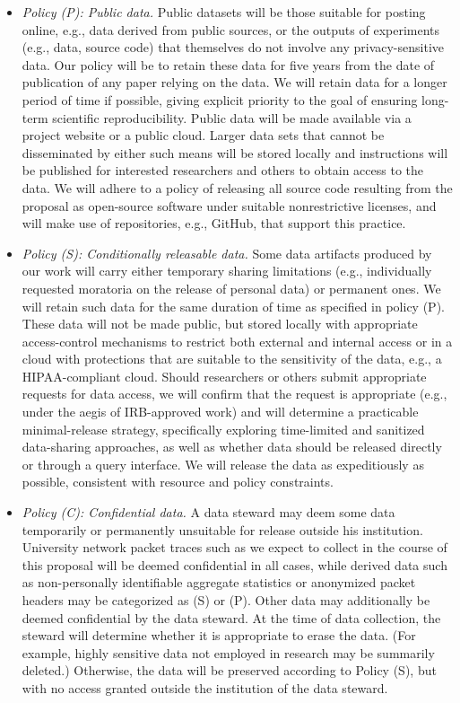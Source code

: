 \begin{itemize}

\item{\em Policy (P): Public data.} Public datasets will be those suitable for
posting online, e.g., data derived from public sources, or the outputs of
experiments (e.g., data, source code) that themselves do not involve any
privacy-sensitive data. Our policy will be to retain these data for five years
from the date of publication of any paper relying on the data. We will retain
data for a longer period of time if possible, giving explicit priority to the
goal of ensuring long-term scientific reproducibility. Public data will be made
available via a project website or a public cloud. Larger data sets that cannot
be disseminated by either such means will be stored locally and instructions
will be published for interested researchers and others to obtain access to the
data. We will adhere to a policy of releasing all source code resulting from the
proposal as open-source software under suitable nonrestrictive licenses, and
will make use of repositories, e.g., GitHub, that support this practice.

\item {\em Policy (S): Conditionally releasable data.} Some data artifacts
produced by our work will carry either temporary sharing limitations (e.g.,
individually requested moratoria on the release of personal data) or permanent
ones. We will retain such data for the same duration of time as specified in
policy (P). These data will not be made public, but stored locally with
appropriate access-control mechanisms to restrict both external and internal
access or in a cloud with protections that are suitable to the sensitivity of
the data, e.g., a HIPAA-compliant cloud. Should researchers or others submit
appropriate requests for data access, we will confirm that the request is
appropriate (e.g., under the aegis of IRB-approved work) and will determine a
practicable minimal-release strategy, specifically exploring time-limited and
sanitized data-sharing approaches, as well as whether data should be released
directly or through a query interface. We will release the data as expeditiously
as possible, consistent with resource and policy constraints.

\item {\em Policy (C): Confidential data.} A data steward may deem some data
temporarily or permanently unsuitable for release outside his institution.
University network packet traces such as we expect to collect in the course of
this proposal will be deemed confidential in all cases, while derived data such
as non-personally identifiable aggregate statistics or anonymized packet headers
may be categorized as (S) or (P). Other data may additionally be deemed
confidential by the data steward. At the time of data collection, the steward
will determine whether it is appropriate to erase the data. (For example, highly
sensitive data not employed in research may be summarily deleted.) Otherwise,
the data will be preserved according to Policy (S), but with no access granted
outside the institution of the data steward.


\end{itemize}
